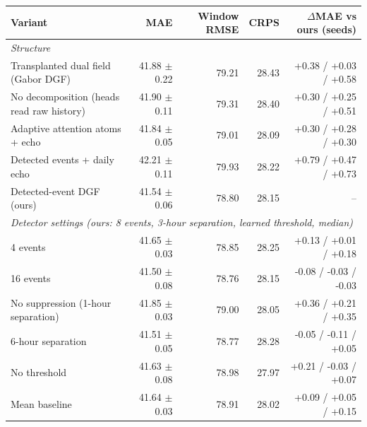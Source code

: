 \begin{tabular}{lrrrr}
\toprule
Variant & MAE & Window RMSE & CRPS & $\Delta$MAE vs ours (seeds) \\
\midrule
\multicolumn{5}{l}{\emph{Structure}} \\
Transplanted dual field (Gabor DGF) & 41.88 $\pm$ 0.22 & 79.21 & 28.43 & +0.38 / +0.03 / +0.58 \\
No decomposition (heads read raw history) & 41.90 $\pm$ 0.11 & 79.31 & 28.40 & +0.30 / +0.25 / +0.51 \\
Adaptive attention atoms + echo & 41.84 $\pm$ 0.05 & 79.01 & 28.09 & +0.30 / +0.28 / +0.30 \\
Detected events + daily echo & 42.21 $\pm$ 0.11 & 79.93 & 28.22 & +0.79 / +0.47 / +0.73 \\
Detected-event DGF (ours) & 41.54 $\pm$ 0.06 & 78.80 & 28.15 & -- \\
\midrule
\multicolumn{5}{l}{\emph{Detector settings (ours: 8 events, 3-hour separation, learned threshold, median)}} \\
4 events & 41.65 $\pm$ 0.03 & 78.85 & 28.25 & +0.13 / +0.01 / +0.18 \\
16 events & 41.50 $\pm$ 0.08 & 78.76 & 28.15 & -0.08 / -0.03 / -0.03 \\
No suppression (1-hour separation) & 41.85 $\pm$ 0.03 & 79.00 & 28.05 & +0.36 / +0.21 / +0.35 \\
6-hour separation & 41.51 $\pm$ 0.05 & 78.77 & 28.28 & -0.05 / -0.11 / +0.05 \\
No threshold & 41.63 $\pm$ 0.08 & 78.98 & 27.97 & +0.21 / -0.03 / +0.07 \\
Mean baseline & 41.64 $\pm$ 0.03 & 78.91 & 28.02 & +0.09 / +0.05 / +0.15 \\
\bottomrule
\end{tabular}
